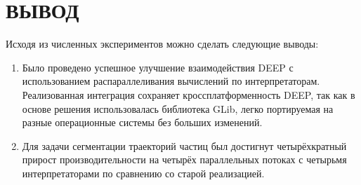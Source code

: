 \chapter*{ВЫВОД}

Исходя из численных экспериментов
можно сделать следующие выводы:
\bigskip

\begin{enumerate}
    \item Было проведено
    успешное улучшение взаимодействия
    DEEP с использованием распараллеливания
    вычислений по интерпретаторам.
    Реализованная интеграция сохраняет
    кроссплатформенность DEEP,
    так как в основе решения
    использовалась библиотека GLib,
    легко портируемая на разные
    операционные системы без
    больших изменений.

    \item Для задачи
    сегментации траекторий частиц
    был достигнут четырёхкратный
    прирост производительности
    на четырёх параллельных потоках
    с четырьмя интерпретаторами
    по сравнению со старой реализацией.
\end{enumerate}

